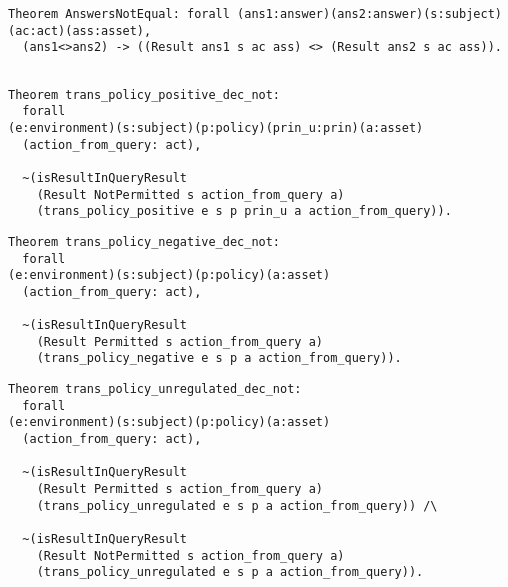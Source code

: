\begin{lstlisting}
Theorem AnswersNotEqual: forall (ans1:answer)(ans2:answer)(s:subject)(ac:act)(ass:asset),
  (ans1<>ans2) -> ((Result ans1 s ac ass) <> (Result ans2 s ac ass)).

\end{lstlisting}

\begin{lstlisting}

Theorem trans_policy_positive_dec_not:
  forall 
(e:environment)(s:subject)(p:policy)(prin_u:prin)(a:asset)
  (action_from_query: act),
 
  ~(isResultInQueryResult 
    (Result NotPermitted s action_from_query a)
    (trans_policy_positive e s p prin_u a action_from_query)).
\end{lstlisting}

\begin{lstlisting}
Theorem trans_policy_negative_dec_not:
  forall 
(e:environment)(s:subject)(p:policy)(a:asset)
  (action_from_query: act),
 
  ~(isResultInQueryResult 
    (Result Permitted s action_from_query a)
    (trans_policy_negative e s p a action_from_query)).

\end{lstlisting}


\begin{lstlisting}
Theorem trans_policy_unregulated_dec_not:
  forall 
(e:environment)(s:subject)(p:policy)(a:asset)
  (action_from_query: act),
 
  ~(isResultInQueryResult 
    (Result Permitted s action_from_query a)
    (trans_policy_unregulated e s p a action_from_query)) /\
  
  ~(isResultInQueryResult 
    (Result NotPermitted s action_from_query a)
    (trans_policy_unregulated e s p a action_from_query)).
\end{lstlisting}















